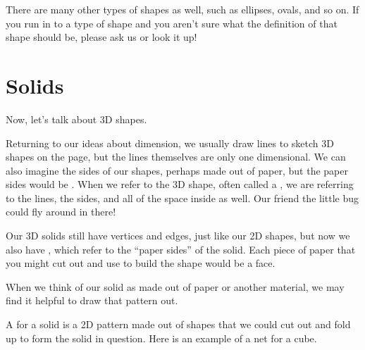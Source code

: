 \documentclass{ximera}
\begin{document}
There are many other types of shapes as well, such as ellipses, ovals, and so on. If you run in to a type of shape and you aren't sure what the definition of that shape should be, please ask us or look it up!


\section{Solids}

Now, let's talk about 3D shapes.

Returning to our ideas about dimension, we usually draw lines to sketch 3D shapes on the page, but the lines themselves are only one dimensional. We can also imagine the sides of our shapes, perhaps made out of paper, but the paper sides would be . When we refer to the 3D shape, often called a , we are referring to the lines, the sides, and all of the space inside as well. Our friend the little bug could fly around in there!

Our 3D solids still have vertices and edges, just like our 2D shapes, but now we also have , which refer to the ``paper sides'' of the solid. Each piece of paper that you might cut out and use to build the shape would be a face.

When we think of our solid as made out of paper or another material, we may find it helpful to draw that pattern out.
\begin{definition}
A  for a solid is a 2D pattern made out of shapes that we could cut out and fold up to form the solid in question. Here is an example of a net for a cube.
\begin{center}
\end{center}
\end{definition}
\end{document}
